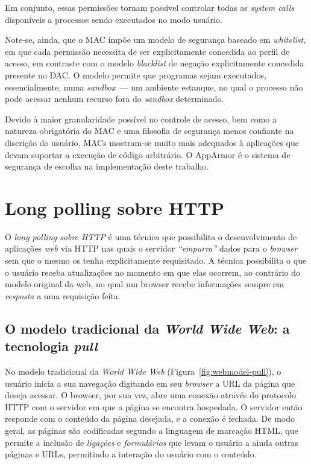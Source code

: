 \documentclass[ruledheader, 12pt]{abnt}
\newcommand{\figref}[1]{(Figura~\ref{fig:#1})}
\begin{document}
Em conjunto, essas permissões tornam possível controlar todas as \emph{system calls} disponíveis a processos sendo executados no modo usuário.

Note-se, ainda, que o MAC impõe um modelo de segurança baseado em \emph{whitelist,} em que cada permissão necessita de ser explicitamente concedida ao perfil de acesso, em contraste com o modelo \emph{blacklist} de negação explicitamente concedida presente no DAC. O modelo permite que programas sejam executados, essencialmente, numa \emph{sandbox}~--- um ambiente estanque, no qual o processo não pode acessar nenhum recurso fora do \emph{sandbox} determinado.

Devido à maior granularidade possível no controle de acesso, bem como a natureza obrigatória do MAC e uma filosofia de segurança menos confiante na discrição do usuário, MACs mostram-se muito mais adequados à aplicações que devam suportar a execução de código arbitrário. O AppArmor é o sistema de segurança de escolha na implementação deste trabalho.

\section{Long polling sobre HTTP}


O \emph{long polling sobre HTTP} é uma técnica que possibilita o desenvolvimento de aplicações \emph{web} via HTTP nas quais o servidor \emph{``empurra''} dados para o \emph{browser} sem que o mesmo os tenha explicitamente requisitado. A técnica possibilita o que o usuário receba atualizações no momento em que elas ocorrem, ao contrário do modelo original da web, no qual um browser recebe informações sempre em \emph{resposta} a uma requisição feita.

\subsection{O modelo tradicional da \emph{World Wide Web}: a tecnologia \emph{pull}}



No modelo tradicional da \emph{World Wide Web} \figref{webmodel-pull}, o usuário inicia a sua navegação digitando em seu \emph{browser} a URL da página que deseja acessar. O browser, por sua vez, abre uma conexão através do protocolo HTTP com o servidor em que a página se encontra hospedada. O servidor então responde com o conteúdo da página desejada, e a conexão é fechada. De modo geral, as páginas são codificadas segundo a linguagem de marcação HTML, que permite a inclusão de \emph{ligações} e \emph{formulários} que levam o usuário a ainda outras páginas e URLs, permitindo a interação do usuário com o conteúdo.
\end{document}
